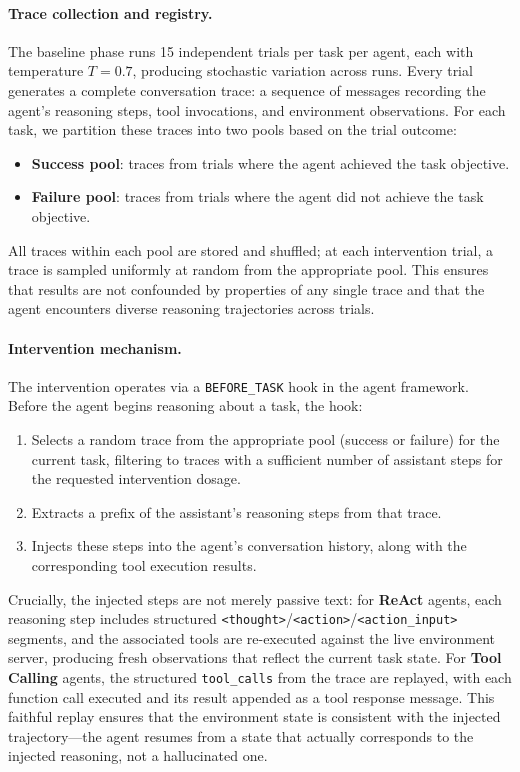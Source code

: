 \paragraph{Trace collection and registry.}
The baseline phase runs 15 independent trials per task per agent, each with temperature $T{=}0.7$, producing stochastic variation across runs.
Every trial generates a complete conversation trace: a sequence of messages recording the agent's reasoning steps, tool invocations, and environment observations.
For each task, we partition these traces into two pools based on the trial outcome:
\begin{itemize}
    \item \textbf{Success pool}: traces from trials where the agent achieved the task objective.
    \item \textbf{Failure pool}: traces from trials where the agent did not achieve the task objective.
\end{itemize}
All traces within each pool are stored and shuffled; at each intervention trial, a trace is sampled uniformly at random from the appropriate pool.
This ensures that results are not confounded by properties of any single trace and that the agent encounters diverse reasoning trajectories across trials.

\paragraph{Intervention mechanism.}
The intervention operates via a \texttt{BEFORE\_TASK} hook in the agent framework.
Before the agent begins reasoning about a task, the hook:
\begin{enumerate}
    \item Selects a random trace from the appropriate pool (success or failure) for the current task, filtering to traces with a sufficient number of assistant steps for the requested intervention dosage.
    \item Extracts a prefix of the assistant's reasoning steps from that trace.
    \item Injects these steps into the agent's conversation history, along with the corresponding tool execution results.
\end{enumerate}

Crucially, the injected steps are not merely passive text: for \textbf{ReAct} agents, each reasoning step includes structured \texttt{<thought>}/\texttt{<action>}/\texttt{<action\_input>} segments, and the associated tools are re-executed against the live environment server, producing fresh observations that reflect the current task state.
For \textbf{Tool Calling} agents, the structured \texttt{tool\_calls} from the trace are replayed, with each function call executed and its result appended as a tool response message.
This faithful replay ensures that the environment state is consistent with the injected trajectory---the agent resumes from a state that actually corresponds to the injected reasoning, not a hallucinated one.

